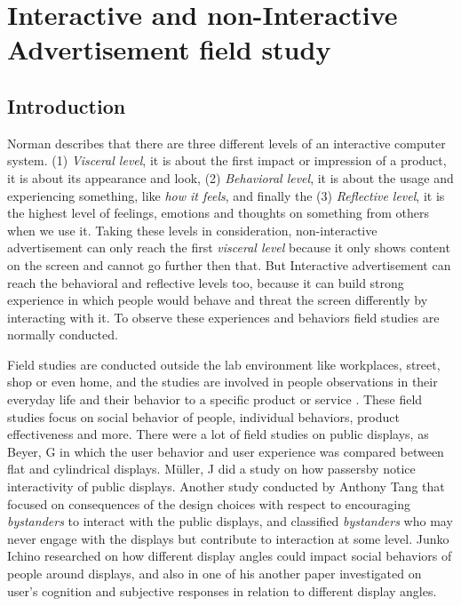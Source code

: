 \chapter{Interactive and non-Interactive Advertisement field study} %

\label{Chapter8} %
\newpage

\section{Introduction}
Norman \cite{norman} describes that there are three different levels of an interactive computer system. (1) \emph{Visceral level}, it is about the first impact or impression of a product, it is about its appearance and look, (2) \emph{Behavioral level}, it is about the usage and experiencing something, like \emph{how it feels}, and finally the (3) \emph{Reflective level}, it is the highest level of feelings, emotions and thoughts on something from others when we use it. Taking these levels in consideration, non-interactive advertisement can only reach the first \emph{visceral level} because it only shows content on the screen and cannot go further then that. But Interactive advertisement can reach the behavioral and reflective levels too, because it can build strong experience in which people would behave and threat the screen differently by interacting with it. To observe these experiences and behaviors field studies are normally conducted.

Field studies are conducted outside the lab environment like workplaces, street, shop or even home, and the studies are involved in people observations in their everyday life and their behavior to a specific product or service \cite{field_study}. These field studies focus on social behavior of people, individual behaviors, product effectiveness and more. There were a lot of field studies on public displays, as Beyer, G \cite{CylindricalScreen} in which the user behavior and user experience was compared between flat and cylindrical displays. Müller, J \cite{LookingGlass} did a study on how passersby notice interactivity of public displays. Another study conducted by Anthony Tang \cite{Bystanders} that focused on consequences of the design choices with respect to encouraging \emph{bystanders} to interact with the public displays, and classified \emph{bystanders} who may never engage with the displays but contribute to interaction at some level. Junko Ichino \cite{DisplayAngleEffect} researched on how different display angles could impact social behaviors of people around displays, and also in one of his another paper \cite{DisplayAngleEffect2} investigated on user's cognition and subjective responses in relation to different display angles.

